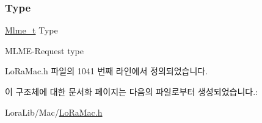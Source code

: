 \mbox{\label{structs_mlme_req_a83b9239b834fa1a95fba118c0a392a8b}} 
\subsubsection{\texorpdfstring{Type}{Type}}
{\footnotesize\ttfamily \mbox{\hyperlink{group___l_o_r_a_m_a_c_ga663544b83d50ec3518608be495896809}{Mlme\+\_\+t}} Type}

M\+L\+M\+E-\/\+Request type 

Lo\+Ra\+Mac.\+h 파일의 1041 번째 라인에서 정의되었습니다.



이 구조체에 대한 문서화 페이지는 다음의 파일로부터 생성되었습니다.\+:\begin{DoxyCompactItemize}
\item 
Lora\+Lib/\+Mac/\mbox{\hyperlink{_lo_ra_mac_8h}{Lo\+Ra\+Mac.\+h}}\end{DoxyCompactItemize}
